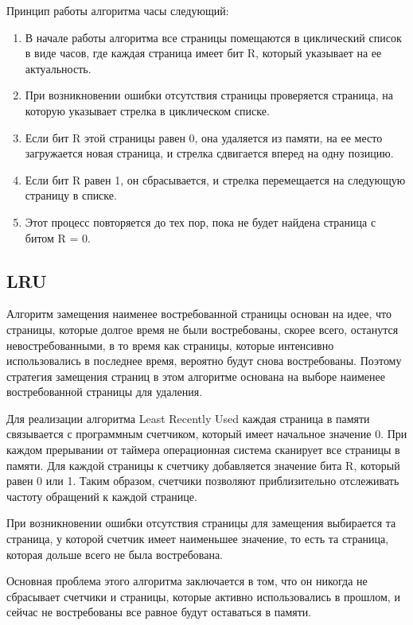 Принцип работы алгоритма часы следующий:
\begin{enumerate}
	\item В начале работы алгоритма все страницы помещаются в циклический список в виде часов, где каждая страница имеет бит R, который указывает на ее актуальность.
	\item При возникновении ошибки отсутствия страницы проверяется страница, на которую указывает стрелка в циклическом списке.
	\item Если бит R этой страницы равен 0, она удаляется из памяти, на ее место загружается новая страница, и стрелка сдвигается вперед на одну позицию.
	\item Если бит R равен 1, он сбрасывается, и стрелка перемещается на следующую страницу в списке.
	\item Этот процесс повторяется до тех пор, пока не будет найдена страница с битом R = 0.
\end{enumerate}

\subsection{LRU}

Алгоритм замещения наименее востребованной страницы основан на идее, что страницы, которые долгое время не были востребованы, скорее всего, останутся невостребованными, в то время как страницы, которые интенсивно использовались в последнее время, вероятно будут снова востребованы.
Поэтому стратегия замещения страниц в этом алгоритме основана на выборе наименее востребованной страницы для удаления.

Для реализации алгоритма Least Recently Used каждая страница в памяти связывается с программным счетчиком, который имеет начальное значение 0.
При каждом прерывании от таймера операционная система сканирует все страницы в памяти. 
Для каждой страницы к счетчику добавляется значение бита R,
который равен 0 или 1. 
Таким образом, счетчики позволяют приблизительно отслеживать частоту обращений к каждой странице.

При возникновении ошибки отсутствия страницы для замещения выбирается та страница, у которой счетчик имеет наименьшее значение, то есть та страница, которая дольше всего не была востребована.

Основная проблема этого алгоритма заключается в том, что он никогда не сбрасывает счетчики и страницы, которые активно использовались в прошлом, и сейчас не востребованы все равное будут оставаться в памяти.

